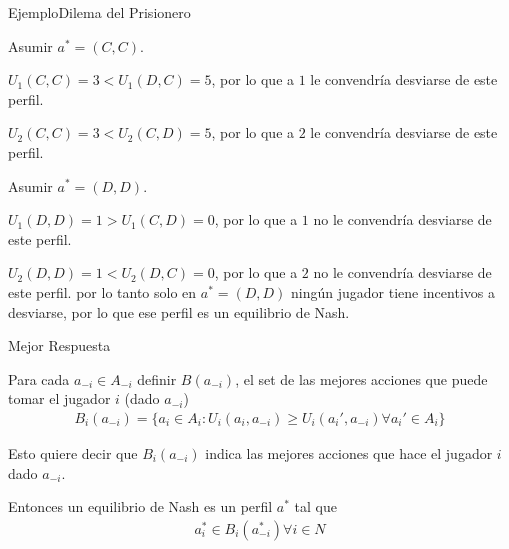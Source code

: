 \documentclass[notes, 11pt]{beamer} %
\newenvironment{wideitemize}{\itemize\addtolength{\itemsep}{10pt}}{\enditemize}
\begin{document}
\begin{frame}{Ejemplo}{Dilema del Prisionero}
	\begin{wideitemize}
		\item Asumir $a^{*} = (C,C)$.
		\begin{wideitemize}
			\item[--] $U_{1}(C,C) = 3 < U_{1}(D,C) = 5$, por lo que a $1$ le convendr\'ia desviarse de este perfil.
			\item[--] $U_{2}(C,C) = 3 < U_{2}(C,D) = 5$, por lo que a $2$ le convendr\'ia desviarse de este perfil.
		\end{wideitemize}
		\item Asumir $a^{*} = (D,D)$.
		\begin{wideitemize}
			\item[--] $U_{1}(D,D) = 1 > U_{1}(C,D) = 0$, por lo que a $1$ no le convendr\'ia desviarse de este perfil.
			\item[--] $U_{2}(D,D) = 1 < U_{2}(D,C) = 0$, por lo que a $2$ no le convendr\'ia desviarse de este perfil.
		\end{wideitemize} por lo tanto solo en $a^{*} = (D,D)$ ning\'un jugador tiene incentivos a desviarse, por lo que ese perfil es un equilibrio de Nash.
	\end{wideitemize}
\end{frame}

\begin{frame}{Mejor Respuesta}
	\begin{wideitemize}
		\item Para cada $a_{-i} \in A_{-i}$ definir $B(a_{-i})$, el set de las mejores acciones que puede tomar el jugador $i$ (dado $a_{-i}$)
		\begin{align*}
			B_{i}(a_{-i}) = \{ a_{i} \in A_{i}: U_{i}(a_{i},a_{-i}) \geq U_{i}(a_{i}',a_{-i}) \forall a_{i}' \in A_{i} \}
		\end{align*}
		\item Esto quiere decir que $B_{i}(a_{-i})$ indica las mejores acciones que hace el jugador $i$ dado $a_{-i}$.
		\item Entonces un equilibrio de Nash es un perfil $a^{*}$ tal que
		\begin{align*}
			a_{i}^{*} \in B_{i}(a_{-i}^{*}) \forall i \in N
		\end{align*}
	\end{wideitemize}
\end{frame}
\end{document}
